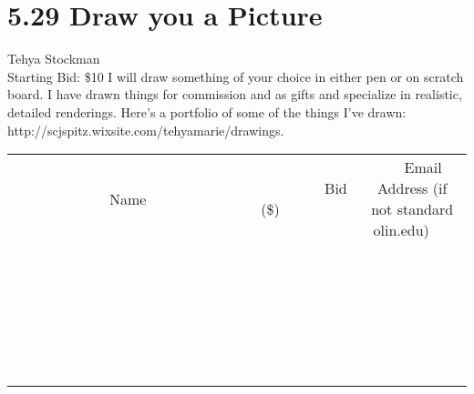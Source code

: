 \documentclass[11pt]{article}
\begin{document}
\section*{5.29 Draw you a Picture}
Tehya Stockman
\\
Starting Bid: \$10
\newline
I will draw something of your choice in either pen or on scratch board. I have drawn things for commission and as gifts  and specialize in realistic, detailed renderings. Here's a portfolio of some of the things I've drawn: http://scjspitz.wixsite.com/tehyamarie/drawings.
\\[6ex]
\begin{tabular}{c c c}
~~~~~~~~~~~~~Name~~~~~~~~~~~~~ & ~~~~~~~~~Bid (\$)~~~~~~~~~  & ~~~Email Address (if not standard olin.edu)~~~\\
 & & \\
\hline
 & & \\
\hline
 & & \\
\hline
 & & \\
\hline
 & & \\
\hline
 & & \\
\hline
 & & \\
\hline
 & & \\
\hline
 & & \\
\hline
 & & \\
\hline
 & & \\
\hline
 & & \\
\hline
 & & \\
\hline
 & & \\
\hline
 & & \\
\hline
 & & \\
\hline
 & & \\
\hline
 & & \\
\hline
 & & \\
\hline
 & & \\
\hline
 & & \\
\hline
 & & \\
\hline
 & & \\
\hline
 & & \\
\hline
 & & \\
\hline
 & & \\
\hline
\end{tabular}
\newpage
\end{document}
